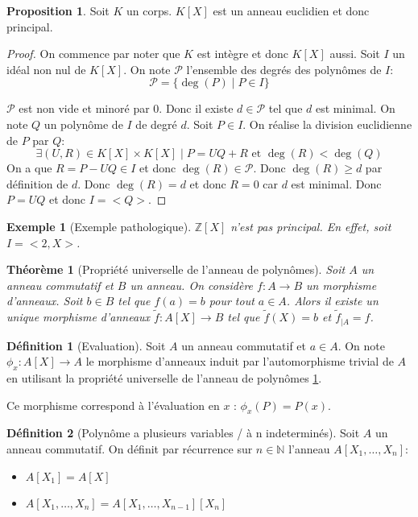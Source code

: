 \documentclass{article}
\theoremstyle{definition}
\newtheorem{definition}{Définition}
\theoremstyle{definition}
\newtheorem{prop}{Proposition}
\theoremstyle{definition}
\theoremstyle{plain}
\newtheorem{example}{Exemple}
\theoremstyle{theorem}
\newtheorem{theorem}{Théorème}
\begin{document}
\begin{prop}
	Soit $K$ un corps. $K[X]$ est un anneau euclidien et donc principal.
\end{prop}

\begin{proof}
	On commence par noter que $K$ est intègre et donc $K[X]$ aussi.
	Soit $I$ un idéal non nul de $K[X]$. On note $\mathcal{P}$ l'ensemble des degrés des polynômes de $I$:
	\[\mathcal{P} = \{ \deg(P) \mid P \in I \}\]

	$\mathcal{P}$ est non vide et minoré par $0$. Donc il existe $d \in \mathcal{P}$ tel que $d$ est minimal.
	On note $Q$ un polynôme de $I$ de degré $d$. Soit $P \in I$. On réalise la division euclidienne de $P$ par $Q$:
	\[ \exists (U, R) \in K[X] \times K[X] \mid P = UQ + R \text{ et } \deg(R) < \deg(Q) \]
	On a que $R = P - UQ \in I$ et donc $\deg(R) \in \mathcal{P}$. Donc $\deg(R) \geq d$ par définition de $d$.
	Donc $\deg(R) = d$ et donc $R = 0$ car $d$ est minimal. Donc $P = UQ$ et donc $I = <Q>$.
\end{proof}


\begin{example}[Exemple pathologique]
	$\mathbb{Z}[X]$ n'est pas principal. En effet, soit $I = <2, X>$.
\end{example}

\begin{theorem}[Propriété universelle de l'anneau de polynômes] \label{thm:prop_univ_anneau_poly}
	\label{thm:prop_univ_anneau_poly}
	Soit $A$ un anneau commutatif et $B$ un anneau. On considère $f: A \to B$ un morphisme d'anneaux.
	Soit $b \in B$ tel que $f(a) = b$ pour tout $a \in A$. Alors il existe un unique morphisme d'anneaux
	$\tilde{f}: A[X] \to B$ tel que $\tilde{f}(X) = b$ et $\tilde{f}_{|A} = f$.
\end{theorem}

\begin{definition}[Evaluation]
	Soit $A$ un anneau commutatif et $a \in A$. On note $\phi_x: A[X] \to A$ le morphisme d'anneaux
	induit par l'automorphisme trivial de $A$ en utilisant la propriété universelle de l'anneau de polynômes \ref{thm:prop_univ_anneau_poly}.

	Ce morphisme correspond à l'évaluation en $x$ : $\phi_x(P) = P(x)$.

\end{definition}

\begin{definition}[Polynôme a plusieurs variables / à n indeterminés]
	Soit $A$ un anneau commutatif. On définit par récurrence sur $n \in \mathbb{N}$ l'anneau $A[X_1, \dots, X_n]$:
	\begin{itemize}
		\item $A[X_1] = A[X]$
		\item $A[X_1, \dots, X_n] = A[X_1, \dots, X_{n-1}][X_n]$
	\end{itemize}
\end{definition}
\end{document}
